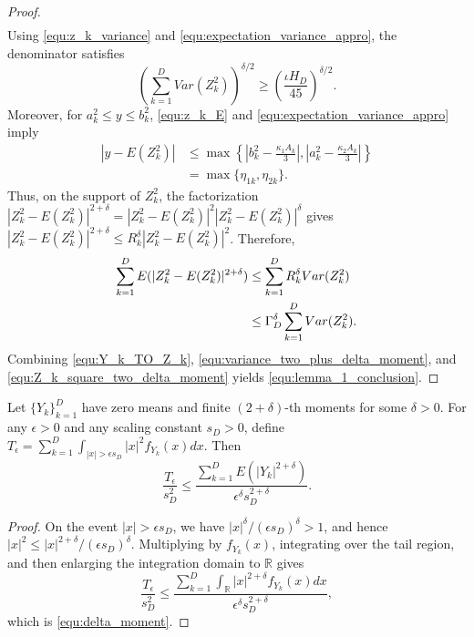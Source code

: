 \begin{lemma}
\begin{proof}
\begin{align}
\end{align}
Using \eqref{equ:z_k_variance} and \eqref{equ:expectation_variance_appro}, the denominator satisfies
\begin{equation}
\left(\sum_{k=1}^{D}Var(Z_k^2)\right)^{\delta/2}
\geq
\left(\frac{\iota H_D}{45}\right)^{\delta/2}.
\label{equ:variance_two_plus_delta_moment}
\end{equation}
Moreover, for $a_k^2\leq y\leq b_k^2$, \eqref{equ:z_k_E} and
\eqref{equ:expectation_variance_appro} imply
\begin{align}
|y-E(Z_k^2)|
&\leq
\max\left\{
\left|b_k^2-\frac{\kappa_1 A_k}{3}\right|,
\left|a_k^2-\frac{\kappa_2 A_k}{3}\right|
\right\}
\label{equ:two_upperbound}\\
&=\max\{\eta_{1k},\eta_{2k}\}.
\label{two_uppbound_eta12}
\end{align}
Thus, on the support of $Z_k^2$, the factorization
$|Z_k^2-E(Z_k^2)|^{2+\delta}=|Z_k^2-E(Z_k^2)|^2|Z_k^2-E(Z_k^2)|^\delta$
gives $|Z_k^2-E(Z_k^2)|^{2+\delta}\leq R_k^\delta |Z_k^2-E(Z_k^2)|^2$.
Therefore,
\begin{align}
\sum_{k=1}^{D}E(|Z_k^2-E(Z_k^2)|^{2+\delta})
&\leq
\sum_{k=1}^{D}R_k^\delta Var(Z_k^2) \notag\\
&\leq
\Gamma_D^\delta
\sum_{k=1}^{D}Var(Z_k^2).
\label{equ:Z_k_square_two_delta_moment}
\end{align}
Combining \eqref{equ:Y_k_TO_Z_k}, \eqref{equ:variance_two_plus_delta_moment},
and \eqref{equ:Z_k_square_two_delta_moment} yields \eqref{equ:lemma_1_conclusion}.
\end{proof}
\end{lemma}

\begin{lemma}\label{lm:delta_moment}
Let $\{Y_k\}_{k=1}^{D}$ have zero means and finite $(2+\delta)$-th
moments for some $\delta>0$. For any $\epsilon>0$ and any scaling
constant $s_D>0$,
define
$T_\epsilon=\sum_{k=1}^{D}\int_{|x|>\epsilon s_D}|x|^2f_{Y_k}(x)dx$.
Then
\begin{equation}
\frac{T_\epsilon}{s_D^2}
\leq
\frac{\sum_{k=1}^{D}E(|Y_k|^{2+\delta})}{\epsilon^\delta s_D^{2+\delta}} .
\label{equ:delta_moment}
\end{equation}
\begin{proof}
On the event $|x|>\epsilon s_D$, we have
$|x|^\delta/(\epsilon s_D)^\delta>1$, and hence
$|x|^2\leq |x|^{2+\delta}/(\epsilon s_D)^\delta$. Multiplying by
$f_{Y_k}(x)$, integrating over the tail region, and then enlarging the
integration domain to $\mathbb{R}$ gives
\begin{equation}
\frac{T_\epsilon}{s_D^2}
\leq
\frac{\sum_{k=1}^{D}\int_{\mathbb{R}}|x|^{2+\delta}f_{Y_k}(x)dx}
{\epsilon^\delta s_D^{2+\delta}},
\end{equation}
which is \eqref{equ:delta_moment}.
\end{proof}
\end{lemma}

